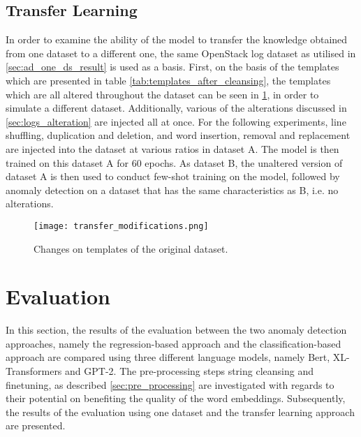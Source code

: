 \subsection{Transfer Learning \label{sec:transfer_learning_setup}}
In order to examine the ability of the model to transfer the knowledge obtained from one dataset to a different one, the same OpenStack log dataset as utilised in \ref{sec:ad_one_ds_result} is used as a basis. First, on the basis of the templates which are presented in table \ref{tab:templates_after_cleansing}, the templates which are all altered throughout the dataset can be seen in \ref{fig:transfer_modifications}, in order to simulate a different dataset. Additionally, various of the alterations discussed in \ref{sec:logs_alteration} are injected all at once. For the following experiments, line shuffling, duplication and deletion, and word insertion, removal and replacement are injected into the dataset at various ratios in dataset A. The model is then trained on this dataset A for 60 epochs. As dataset B, the unaltered version of dataset A is then used to conduct few-shot training on the model, followed by anomaly detection on a dataset that has the same characteristics as B, i.e. no alterations.

\begin{figure}[H]
  \centering
  \texttt{[image: transfer\_modifications.png]}\\
  \caption{Changes on templates of the original dataset.}
  \label{fig:transfer_modifications}
\end{figure}




\section{Evaluation\label{sec:evaluation}}
In this section, the results of the evaluation between the two anomaly detection approaches, namely the regression-based approach and the classification-based approach are compared using three different language models, namely Bert, XL-Transformers and GPT-2. The pre-processing steps string cleansing and finetuning, as described \ref{sec:pre_processing} are investigated with regards to their potential on benefiting the quality of the word embeddings. Subsequently, the results of the evaluation using one dataset and the transfer learning approach are presented.

